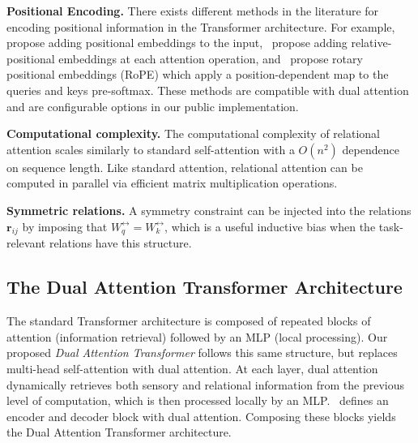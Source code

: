 \textbf{Positional Encoding.} There exists different methods in the literature for encoding positional information in the Transformer architecture. For example,~\citep{vaswani2017attention} propose adding positional embeddings to the input,~\citep{shawSelfAttentionRelativePosition2018b} propose adding relative-positional embeddings at each attention operation, and~\citep{suRoFormerEnhancedTransformer2023} propose rotary positional embeddings (RoPE) which apply a position-dependent map to the queries and keys pre-softmax. These methods are compatible with dual attention and are configurable options in our public implementation.

\textbf{Computational complexity.} The computational complexity of relational attention scales similarly to standard self-attention with a $O(n^2)$ dependence on sequence length. Like standard attention, relational attention can be computed in parallel via efficient matrix multiplication operations.

\textbf{Symmetric relations.} A symmetry constraint can be injected into the relations $\bm{r}_{ij}$ by imposing that $W_{q}^{\rel} = W_k^{\rel}$, which is a useful inductive bias when the task-relevant relations have this structure.


\subsection{The Dual Attention Transformer Architecture}

The standard Transformer architecture is composed of repeated blocks of attention (information retrieval) followed by an MLP (local processing). Our proposed \textit{Dual Attention Transformer} follows this same structure, but replaces multi-head self-attention with dual attention.  At each layer, dual attention dynamically retrieves both sensory and relational information from the previous level of computation, which is then processed locally by an MLP.~ defines an encoder and decoder block with dual attention. Composing these blocks yields the Dual Attention Transformer architecture.

